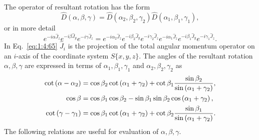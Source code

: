 The operator of resultant rotation has the form
\begin{equation}
\widehat{D}(\alpha, \beta, \gamma)=\widehat{D}\left(\alpha_{2}, \beta_{2}, \gamma_{2}\right) \widehat{D}\left(\alpha_{1}, \beta_{1}, \gamma_{1}\right) ,\label{eq:1:4:64}
\end{equation}
or in more detail
\begin{equation}
e^{-i \alpha \hat{J}_{z}} e^{-i \beta \hat{J}_{y}} e^{-i \gamma \hat{J}_{z}}=e^{-i \alpha_{2} \hat{J}_{z}} e^{-i \beta_{2} \hat{J}_{y}} e^{-i \gamma_{2} \hat{J}_{z}} e^{-i \alpha_{1} \hat{J}_{z}} e^{-i \beta_{1} \hat{J}_{y}} e^{-i \gamma_{1} \hat{J}_{z}} . \label{eq:1:4:65}
\end{equation}
In Eq.~\eqref{eq:1:4:65} \(\widehat{J}_{i}\) is the projection of the total angular momentum operator on an \(i\)-axis of the coordinate system \(S\{x, y, z\}\). The angles of the resultant rotation \(\alpha, \beta, \gamma\) are expressed in terms of \(\alpha_{1}, \beta_{1}, \gamma_{1}\) and \(\alpha_{2}, \beta_{2}, \gamma_{2}\) as
\begin{align}
\cot \left(\alpha-\alpha_{2}\right) & =\cos \beta_{2} \cot \left(\alpha_{1}+\gamma_{2}\right)+\cot \beta_{1} \frac{\sin \beta_{2}}{\sin \left(\alpha_{1}+\gamma_{2}\right)} , \notag\\
\cos \beta & =\cos \beta_{1} \cos \beta_{2}-\sin \beta_{1} \sin \beta_{2} \cos \left(\alpha_{1}+\gamma_{2}\right) , \label{eq:1:4:66}\\
\cot \left(\gamma-\gamma_{1}\right) & =\cos \beta_{1} \cot \left(\alpha_{1}+\gamma_{2}\right)+\cot \beta_{2} \frac{\sin \beta_{1}}{\sin \left(\alpha_{1}+\gamma_{2}\right)} .\notag
\end{align}
The following relations are useful for evaluation of \(\alpha, \beta, \gamma\).
